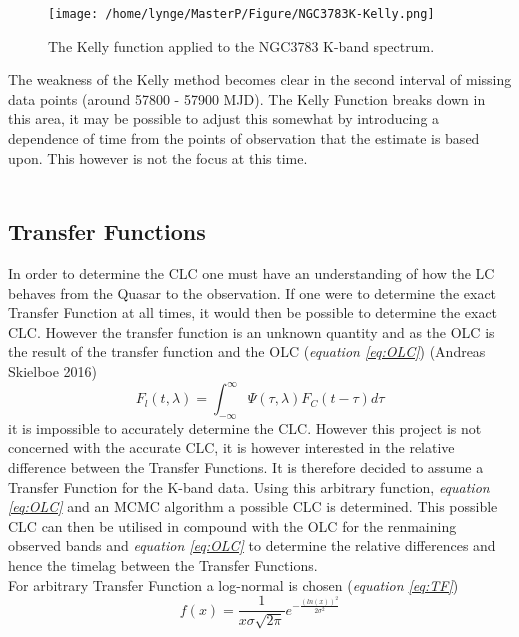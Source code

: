 \documentclass[twocolumn]{article}
\begin{document}
\begin{figure}[htp!]
\centering
\texttt{[image: /home/lynge/MasterP/Figure/NGC3783K-Kelly.png]}\\
\caption{The Kelly function applied to the NGC3783 K-band spectrum.}
\label{fig:NGC3783K-Kelly}
\end{figure}

The weakness of the Kelly method becomes clear in the second interval of missing data points (around 57800 - 57900 MJD). The Kelly Function breaks down in this area, it may be possible to adjust this somewhat by introducing a dependence of time from the points of observation that the estimate is based upon. This however is not the focus at this time. \\
\\
\subsection{Transfer Functions}
In order to determine the CLC one must have an understanding of how the LC behaves from the Quasar to the observation. If one were to determine the exact Transfer Function at all times, it would then be possible to determine the exact CLC. However the transfer function is an unknown quantity and as the OLC is the result of the transfer function and the OLC (\emph{equation \ref{eq:OLC}}) (Andreas Skielboe 2016)
\begin{equation}
F_l(t,\lambda) = \int_{-\infty}^{\infty}\Psi(\tau,\lambda)F_C(t-\tau)d\tau
\label{eq:OLC}
\end{equation}
it is impossible to accurately determine the CLC. However this project is not concerned with the accurate CLC, it is however interested in the relative difference between the Transfer Functions. It is therefore decided to assume a Transfer Function for the K-band data. Using this arbitrary function, \emph{equation \ref{eq:OLC}} and an MCMC algorithm a possible CLC is determined. This possible CLC can then be utilised in compound with the OLC for the renmaining observed bands and \emph{equation \ref{eq:OLC}} to determine the relative differences and hence the timelag between the Transfer Functions. \\
For arbitrary Transfer Function a log-normal is chosen (\emph{equation \ref{eq:TF}})
\begin{equation}
f(x) = \frac{1}{x\sigma\sqrt{2\pi}}e^{-\frac{(ln(x))^2}{2\sigma^2}}
\label{eq:TF}
\end{equation}
\end{document}
